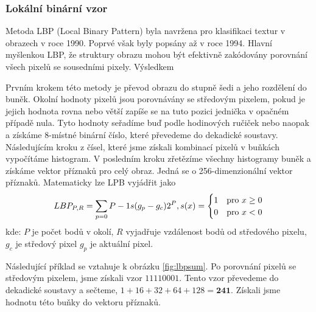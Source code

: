 \subsubsection{Lokální binární vzor}
Metoda LBP (Local Binary Pattern) byla navržena pro klasifikaci textur v obrazech v roce 1990. \cite{lbp:texture} Poprvé však byly popsány až v roce 1994. \cite{lbp:first} Hlavní myšlenkou LBP, že struktury obrazu mohou být efektivně zakódovány porovnání všech pixelů se sousedními pixely. Výsledkem

Prvním krokem této metody je převod obrazu do stupně šedi a jeho rozdělení do buněk. Okolní hodnoty pixelů jsou porovnávány se středovým pixelem, pokud je jejich hodnota rovna nebo větší zapíše se na tuto pozici jednička v opačném případě nula. Tyto hodnoty seřadíme buď podle hodinových ručiček nebo naopak a získáme 8-místné binární číslo, které převedeme do dekadické soustavy. Následujícím kroku z čísel, které jsme získali kombinací pixelů v buňkách vypočítáme histogram. V posledním kroku zřetězíme všechny histogramy buněk a získáme vektor příznaků pro celý obraz. Jedná se o 256-dimenzionální vektor příznaků. 
Matematicky lze LPB vyjádřit jako
\begin{equation*}
LBP_{P,R} = \sum_{p=0}{P-1} s(g_p - g_c)2^P, \\
s(x) =
  \begin{cases} 
   1 & \text{pro } x \geq 0 \\
   0       & \text{pro } x < 0
  \end{cases}
\end{equation*}
kde: $P$ je počet bodů v okolí, $R$ vyjadřuje vzdálenost bodů od středového pixelu, $g_c$ je středový pixel $g_p$ je aktuální pixel. 

Následující příklad se vztahuje k obrázku \ref{fig:lbpsum}. Po porovnání pixelů se středovým pixelem, jsme získali vzor $11110001$. Tento vzor převedeme do dekadické soustavy a sečteme, $ 1+16+32+64+128 = \textbf{241}$. Získali jsme hodnotu této buňky do vektoru příznaků.


